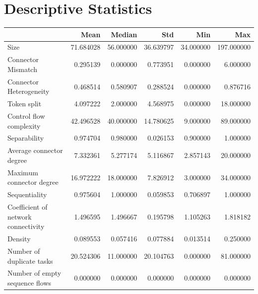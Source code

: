\documentclass[a4paper]{article}
\begin{document}
\section*{Descriptive Statistics}
\begin{center}
\begin{tabular}{lrrrrr}
\toprule
 & Mean & Median & Std & Min & Max \\
\midrule
Size & 71.684028 & 56.000000 & 36.639797 & 34.000000 & 197.000000 \\
Connector Mismatch & 0.295139 & 0.000000 & 0.773951 & 0.000000 & 6.000000 \\
Connector Heterogeneity & 0.468514 & 0.580907 & 0.288524 & 0.000000 & 0.876716 \\
Token split & 4.097222 & 2.000000 & 4.568975 & 0.000000 & 18.000000 \\
Control flow complexity & 42.496528 & 40.000000 & 14.780625 & 9.000000 & 89.000000 \\
Separability & 0.974704 & 0.980000 & 0.026153 & 0.900000 & 1.000000 \\
Average connector degree & 7.332361 & 5.277174 & 5.116867 & 2.857143 & 20.000000 \\
Maximum connector degree & 16.972222 & 18.000000 & 7.826912 & 3.000000 & 34.000000 \\
Sequentiality & 0.975604 & 1.000000 & 0.059853 & 0.706897 & 1.000000 \\
Coefficient of network connectivity & 1.496595 & 1.496667 & 0.195798 & 1.105263 & 1.818182 \\
Density & 0.089553 & 0.057416 & 0.077884 & 0.013514 & 0.250000 \\
Number of duplicate tasks & 20.524306 & 11.000000 & 20.104763 & 0.000000 & 81.000000 \\
Number of empty sequence flows & 0.000000 & 0.000000 & 0.000000 & 0.000000 & 0.000000 \\
\bottomrule
\end{tabular}
\end{center}
\end{document}
